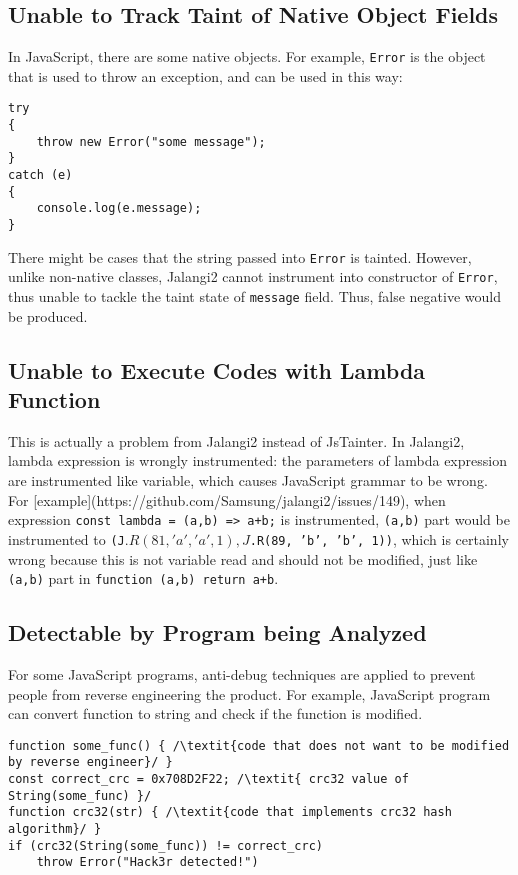 \subsection{Unable to Track Taint of Native Object Fields}

In JavaScript, there are some native objects. For example, \texttt{Error} is the object that is used to throw an exception, and can be used in this way:

\begin{verbatim}
try
{
    throw new Error("some message");
}
catch (e)
{
    console.log(e.message);
}
\end{verbatim}

There might be cases that the string passed into \texttt{Error} is tainted. However, unlike non-native classes, Jalangi2 cannot instrument into constructor of \texttt{Error}, thus unable to tackle the taint state of \texttt{message} field. Thus, false negative would be produced.

\subsection{Unable to Execute Codes with Lambda Function}

This is actually a problem from Jalangi2 instead of JsTainter. In Jalangi2, lambda expression is wrongly instrumented: the parameters of lambda expression are instrumented like variable, which causes JavaScript grammar to be wrong. For [example](https://github.com/Samsung/jalangi2/issues/149), when expression \texttt{const lambda = (a,b) => a+b;} is instrumented, \texttt{(a,b)} part would be instrumented to \texttt{(J$.R(81, 'a', 'a', 1), J$.R(89, 'b', 'b', 1))}, which is certainly wrong because this is not variable read and should not be modified, just like \texttt{(a,b)} part in \texttt{function (a,b) {return a+b}}.

\subsection{Detectable by Program being Analyzed}

For some JavaScript programs, anti-debug techniques are applied to prevent people from reverse engineering the product. For example, JavaScript program can convert function to string and check if the function is modified.

\begin{verbatim}
function some_func() { /\textit{code that does not want to be modified by reverse engineer}/ }
const correct_crc = 0x708D2F22; /\textit{ crc32 value of String(some_func) }/
function crc32(str) { /\textit{code that implements crc32 hash algorithm}/ }
if (crc32(String(some_func)) != correct_crc)
    throw Error("Hack3r detected!")
\end{verbatim}

